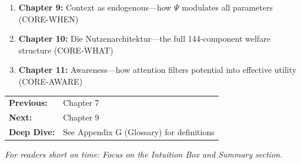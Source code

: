 \begin{enumerate}[nosep]
    \item \textbf{Chapter 9:} Context as endogenous---how $\Psi$ modulates all parameters (CORE-WHEN)
    \item \textbf{Chapter 10:} Die Nutzenarchitektur---the full 144-component welfare structure (CORE-WHAT)
    \item \textbf{Chapter 11:} Awareness---how attention filters potential into effective utility (CORE-AWARE)
\end{enumerate}

\begin{tcolorbox}[
    colback=green!5!white,
    colframe=green!75!black,
    title={\textbf{Reading Path}},
    fonttitle=\bfseries
]
\begin{tabular}{@{}ll@{}}
\textbf{Previous:} & Chapter 7 \\
\textbf{Next:} & Chapter 9 \\
\textbf{Deep Dive:} & See Appendix G (Glossary) for definitions \\
\end{tabular}

\medskip
\textit{For readers short on time: Focus on the Intuition Box and Summary section.}
\end{tcolorbox}

